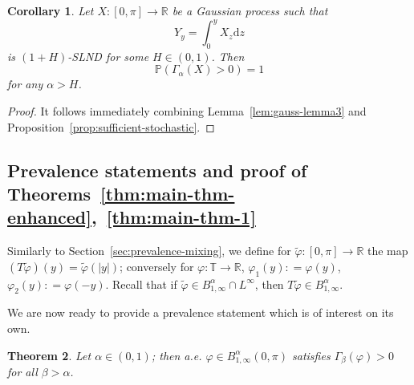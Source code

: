 \documentclass[11pt,oneside,reqno]{amsart}
\newcommand{\mathd}{\mathrm{d}}
\newtheorem{theorem}{Theorem}[section]
\newtheorem{corollary}[theorem]{Corollary}
\numberwithin{equation}{section}
\begin{document}
\begin{corollary}
  \label{cor:gauss-wei}Let $X : [0, \pi] \rightarrow \mathbb{R}$ be a Gaussian
  process such that
  \[ Y_y = \int_0^y X_z \mathd z  \]
  is $(1 + H)$\mbox{-}SLND for some $H \in (0, 1)$. Then
  \[ \mathbb{P} (\Gamma_{\alpha} (X) > 0) = 1 \]
  for any $\alpha > H$.
\end{corollary}

\begin{proof}
  It follows immediately combining Lemma~\ref{lem:gauss-lemma3} and
  Proposition~\ref{prop:sufficient-stochastic}.
\end{proof}

\subsection{Prevalence statements and proof of
Theorems~\ref{thm:main-thm-enhanced},~\ref{thm:main-thm-1}}\label{sec:prevalence-enhanced}

Similarly to Section~\ref{sec:prevalence-mixing}, we define for
$\tilde{\varphi} : [0, \pi] \rightarrow \mathbb{R}$ the map $(T
\tilde{\varphi}) (y) = \tilde{\varphi} (| y |)$; conversely for $\varphi :
\mathbb{T} \rightarrow \mathbb{R}$, $\varphi_1 (y) : = \varphi (y)$,
$\varphi_2 (y) : = \varphi (- y)$. Recall that if $\tilde{\varphi} \in
B^{\alpha}_{1, \infty} \cap L^{\infty}$, then $T \tilde{\varphi} \in
B^{\alpha}_{1, \infty}$.

We are now ready to provide a prevalence statement which is of interest on its
own.

\begin{theorem}
  \label{thm:prevalence-interval-wei}Let $\alpha \in (0, 1)$; then a.e.
  $\varphi \in B^{\alpha}_{1, \infty} (0, \pi)$ satisfies $\Gamma_{\beta}
  (\varphi) > 0$ for all $\beta > \alpha$.
\end{theorem}
\end{document}
